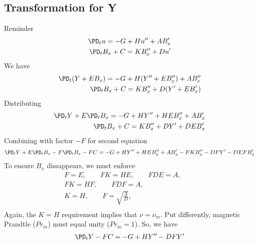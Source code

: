 \documentclass[11pt]{article}
\begin{document}
\subsection{Transformation for Y}
Reminder
\begin{equation}\begin{aligned}
\PD_t u                 = -G+ H u'' + A B_x' \\
\PD_t B_x + C = K B_x'' + D u' \\
\end{aligned} \end{equation}
We have
\begin{equation}\begin{aligned}
\PD_t (Y + E B_x)        = -G+ H (Y'' + E B_x'') + A B_x'' \\
\PD_t B_x + C = K B_x'' + D (Y' + E B_x') \\
\end{aligned} \end{equation}
Distributing
\begin{equation}\begin{aligned}
\PD_t Y + E \PD_t B_x = -G+ H Y'' + H E B_x'' + A B_x' \\
\PD_t B_x + C = K B_x'' + D Y' + D E B_x' \\
\end{aligned} \end{equation}
Combining with factor $-F$ for second equation
\begin{equation}\begin{aligned}
\PD_t Y + E \PD_t B_x - F \PD_t B_x - F C = -G+ H Y'' + H E B_x'' + A B_x' - F K B_x'' - D F Y' - D E F B_x'\\
\end{aligned} \end{equation}
To ensure $B_x$ dissappears, we must enforce
\begin{equation}\begin{aligned}
F = E, \qquad
FK = HE, \qquad
FDE = A, \qquad \\
FK = HF, \qquad
FDF = A, \qquad \\
K = H, \qquad
F = \sqrt{\frac{A}{D}}, \qquad \\
\end{aligned} \end{equation}
Again, the $K=H$ requirement implies that $\nu = \nu_m$. Put differently, magnetic Prandtle ($Pr_m$) must equal unity ($Pr_m = 1$). So, we have
\begin{equation}\begin{aligned}
\PD_t Y - FC = -G+ H Y'' - DF Y'\\
\end{aligned} \end{equation}
\end{document}
